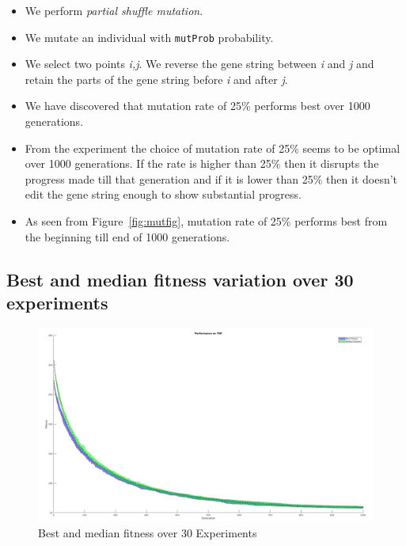\documentclass[a4paper, 12pt]{article}
\begin{document}
\begin{itemize}
    \item We perform \textit{partial shuffle mutation}.
    \item We mutate an individual with \texttt{mutProb} probability.
    \item We select two points \textit{i,j}. We reverse the gene string between \textit{i} and \textit{j} and retain the parts of the gene string before \textit{i} and after \textit{j}.
    \item We have discovered that mutation rate of 25\% performs best over 1000 generations.
    \item From the experiment the choice of mutation rate of 25\% seems to be optimal over 1000 generations. If the rate is higher than 25\% then it disrupts the progress made till that generation and if it is lower than 25\% then it doesn't edit the gene string enough to show substantial progress.
    \item As seen from Figure~\ref{fig:mutfig}, mutation rate of 25\% performs best from the beginning till end of 1000 generations.
\end{itemize}

\newpage
\subsection{Best and median fitness variation over 30 experiments}
\begin{figure}[ht!]
  \centering
  \includegraphics[width=1.0\textwidth]{images/1000X30_updated.jpg}
  \caption{Best and median fitness over 30 Experiments\label{fig:plot}}
\end{figure}

\newpage
\end{document}
